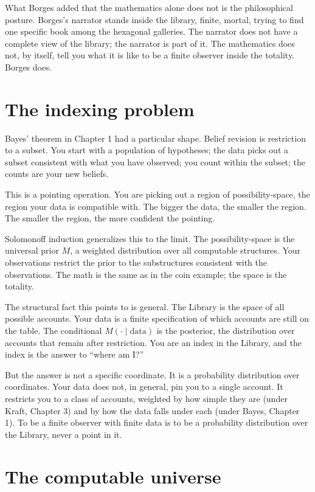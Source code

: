 What Borges added that the mathematics alone does not is the philosophical posture. Borges's narrator stands inside the library, finite, mortal, trying to find one specific book among the hexagonal galleries. The narrator does not have a complete view of the library; the narrator is part of it. The mathematics does not, by itself, tell you what it is like to be a finite observer inside the totality. Borges does.

\section*{The indexing problem}

Bayes' theorem in Chapter 1 had a particular shape. Belief revision is restriction to a subset. You start with a population of hypotheses; the data picks out a subset consistent with what you have observed; you count within the subset; the counts are your new beliefs.

This is a pointing operation. You are picking out a region of possibility-space, the region your data is compatible with. The bigger the data, the smaller the region. The smaller the region, the more confident the pointing.

Solomonoff induction generalizes this to the limit. The possibility-space is the universal prior $M$, a weighted distribution over all computable structures. Your observations restrict the prior to the substructures consistent with the observations. The math is the same as in the coin example; the space is the totality.

The structural fact this points to is general. The Library is the space of all possible accounts. Your data is a finite specification of which accounts are still on the table. The conditional $M(\cdot \mid \text{data})$ is the posterior, the distribution over accounts that remain after restriction. You are an index in the Library, and the index is the answer to ``where am I?''

But the answer is not a specific coordinate. It is a probability distribution over coordinates. Your data does not, in general, pin you to a single account. It restricts you to a class of accounts, weighted by how simple they are (under Kraft, Chapter 3) and by how the data falls under each (under Bayes, Chapter 1). To be a finite observer with finite data is to be a probability distribution over the Library, never a point in it.

\section*{The computable universe}

